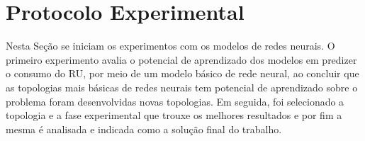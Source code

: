                 \begin{figure}[H]
                \end{figure}  

        
                       \begin{figure}[H]
                \end{figure}
           

\section{Protocolo Experimental}
    Nesta Seção se iniciam os experimentos com os modelos de redes neurais.
    O primeiro experimento avalia o potencial de aprendizado dos modelos em  predizer o consumo do RU, por meio de um modelo básico de rede neural, ao concluir que as topologias mais básicas de redes neurais tem potencial de aprendizado sobre o problema foram desenvolvidas novas topologias.
    Em seguida, foi selecionado a topologia e a fase experimental que trouxe os melhores resultados e por fim a mesma é analisada e indicada como a solução final do trabalho.
    
